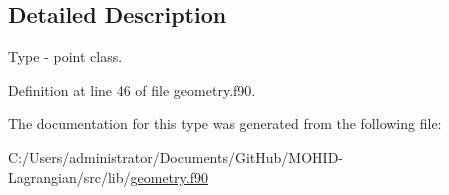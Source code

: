 \subsection{Detailed Description}
Type -\/ point class. 

Definition at line 46 of file geometry.\+f90.



The documentation for this type was generated from the following file\+:\begin{DoxyCompactItemize}
\item 
C\+:/\+Users/administrator/\+Documents/\+Git\+Hub/\+M\+O\+H\+I\+D-\/\+Lagrangian/src/lib/\mbox{\hyperlink{geometry_8f90}{geometry.\+f90}}\end{DoxyCompactItemize}
